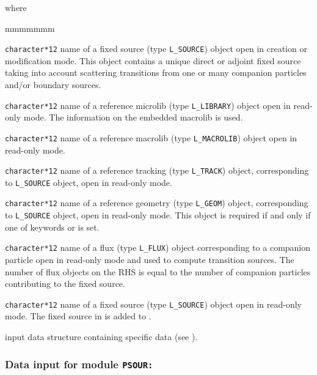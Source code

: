 \noindent where
\begin{ListeDeDescription}{mmmmmmm}

\item[\dusa{SOURCE}] {\tt character*12} name of a {\sc fixed source} (type {\tt L\_SOURCE}) object open in creation or modification
mode. This object contains a unique direct or adjoint fixed source taking into account scattering transitions from one or many companion particles and/or boundary sources.

\item[\dusa{MICRO}] {\tt character*12} name of a reference {\sc microlib} (type {\tt L\_LIBRARY}) object open in read-only mode. The information on
the embedded macrolib is used.

\item[\dusa{MACRO}] {\tt character*12} name of a reference {\sc macrolib} (type {\tt L\_MACROLIB}) object open in read-only mode.

\item[\dusa{TRACK}] {\tt character*12} name of a reference {\sc tracking} (type {\tt L\_TRACK}) object, corresponding to {\tt L\_SOURCE} object, open in read-only mode.

\item[\dusa{GEONAM}] {\tt character*12} name of a reference {\sc geometry} (type {\tt L\_GEOM}) object, corresponding to {\tt L\_SOURCE} object, open in read-only mode. This
object is required if and only if one of keywords  or  is set.

\item[\dusa{FLUX}] {\tt character*12} name of a {\sc flux} (type {\tt L\_FLUX}) object corresponding to a companion particle open in read-only mode and used to
compute transition sources. The number of {\sc flux} objects on the RHS is equal to the number of companion particles contributing to the fixed source.

\item[\dusa{SOURCE2}] {\tt character*12} name of a {\sc fixed source} (type {\tt L\_SOURCE}) object open in read-only mode. The fixed source in  is
added to .

\item[\dusa{PSOUR\_data}] input data structure containing specific data (see ).

\end{ListeDeDescription}

\subsubsection{Data input for module {\tt PSOUR:}}\label{sect:descPSOUR}

